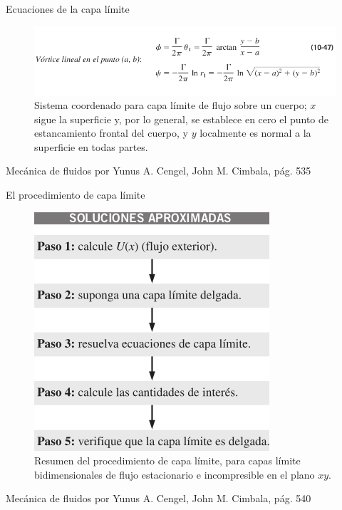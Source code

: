 
\begin{frame}{Ecuaciones de la capa límite}
\justifying
\begin{figure}[H]
\centering
\includegraphics[scale=0.25]{Section_Files/S3-imagenes-Jhon/0123.png}
\caption{Sistema coordenado para capa límite de flujo sobre un cuerpo; $ x $ sigue la superficie y, por lo general, se establece en cero el punto de estancamiento frontal del cuerpo, y $ y $ localmente es normal a la superficie en todas partes.}
\end{figure}
{\tiny Mecánica de fluidos por Yunus A. Cengel, John M. Cimbala, pág. 535}
\end{frame}


\begin{frame}{El procedimiento de capa límite}
\justifying
\begin{figure}[H]
\centering
\includegraphics[scale=0.25]{Section_Files/S3-imagenes-Jhon/0202.png}
\caption{Resumen del procedimiento de capa límite, para capas límite bidimensionales de flujo estacionario e incompresible en el plano $xy$.}
\end{figure}
{\tiny Mecánica de fluidos por Yunus A. Cengel, John M. Cimbala, pág. 540}
\end{frame}

